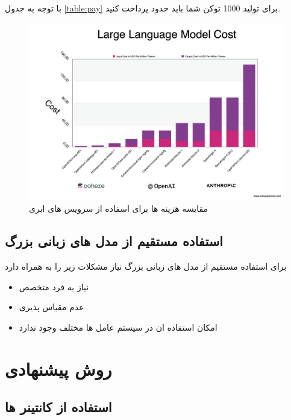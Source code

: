 با توجه به جدول \ref{table:pay} برای تولید 1000 توکن شما باید حدود  پرداخت کنید.

\begin{figure}[!htb]
  \centering
  \includegraphics[scale=.3]{Figures/657b748bc22e00d9d57ba827_6502a4b5bada5953b9d8aff6_1 FWRHD8OaVBAF-yNhpT2fOQ.png}
  \caption{مقایسه هزینه ها برای اسفاده از سرویس های ابری\cite{greyling}}
\end{figure}

\subsection{استفاده مستقیم از مدل های زبانی بزرگ}
برای استفاده مستقیم از مدل های زبانی بزرگ نیاز مشکلات زیر را به همراه دارد
\begin{itemize}[label=-]
  \item
   نیاز به فرد متخصص
   \item
   عدم مقیاس پذیری
   \item
  امکان استفاده ان در سیستم عامل ها مختلف وجود ندارد
\end{itemize}

\section{روش پیشنهادی}
\subsection{استفاده از کانتینر ها}

